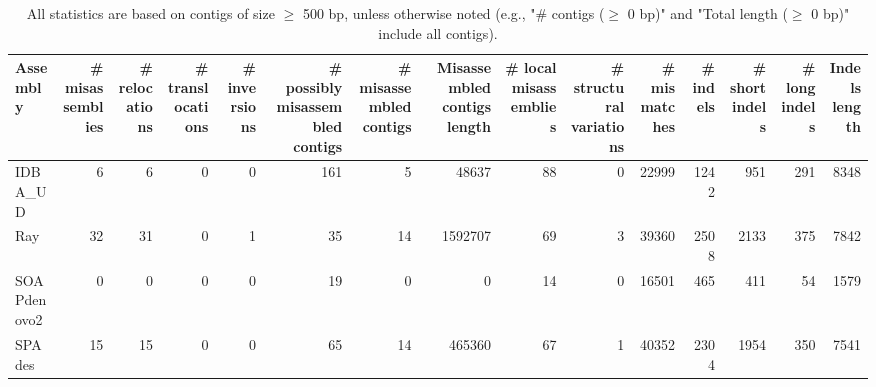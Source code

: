 \documentclass[12pt,a4paper]{article}
\begin{document}
\begin{table}[ht]
\begin{center}
\caption{All statistics are based on contigs of size $\geq$ 500 bp, unless otherwise noted (e.g., "\# contigs ($\geq$ 0 bp)" and "Total length ($\geq$ 0 bp)" include all contigs).}
\begin{tabular}{|l*{14}{|r}|}
\hline
Assembly & \# misassemblies &     \# relocations &     \# translocations &     \# inversions & \# possibly misassembled contigs & \# misassembled contigs & Misassembled contigs length & \# local misassemblies & \# structural variations & \# mismatches & \# indels &     \# short indels &     \# long indels & Indels length \\ \hline
IDBA\_UD & 6 & 6 & 0 & 0 & 161 & 5 & 48637 & 88 & 0 & 22999 & 1242 & 951 & 291 & 8348 \\ \hline
Ray & 32 & 31 & 0 & 1 & 35 & 14 & 1592707 & 69 & 3 & 39360 & 2508 & 2133 & 375 & 7842 \\ \hline
SOAPdenovo2 & 0 & 0 & 0 & 0 & 19 & 0 & 0 & 14 & 0 & 16501 & 465 & 411 & 54 & 1579 \\ \hline
SPAdes & 15 & 15 & 0 & 0 & 65 & 14 & 465360 & 67 & 1 & 40352 & 2304 & 1954 & 350 & 7541 \\ \hline
\end{tabular}
\end{center}
\end{table}
\end{document}
